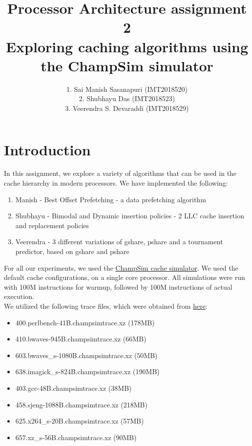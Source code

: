 \documentclass[a4paper]{article}
\title{Processor Architecture assignment 2\\\Large{Exploring caching algorithms using the ChampSim simulator}}
\author{1. Sai Manish Sasanapuri (IMT2018520)\\ 2. Shubhayu Das (IMT2018523)\\  3. Veerendra S. Devaraddi (IMT2018529)}
\begin{document}
\maketitle
\tableofcontents
\pagebreak

\section{Introduction}
    In this assignment, we explore a variety of algorithms that can be used in the cache hierarchy in modern processors. We have implemented the following:
    \begin{enumerate}
        \item Manish - Best Offset Prefetching - a data prefetching algorithm
        \item Shubhayu - Bimodal and Dynamic insertion policies - 2 LLC cache insertion and replacement policies
        \item Veerendra - 3 different variations of gshare, pshare and a tournament predictor, based on gshare and pshare
    \end{enumerate}
    
    For all our experiments, we used the \href{https://github.com/ChampSim/ChampSim}{ChampSim cache simulator}. We used the default cache configurations, on a single core processor. All simulations were run with 100M instructions for warmup, followed by 100M instructions of actual execution.\\
    
    We utilized the following trace files, which were obtained from \href{http://hpca23.cse.tamu.edu/champsim-traces/speccpu/}{here}:
    \begin{itemize}
        \item 400.perlbench-41B.champsimtrace.xz (178MB)
        \item 410.bwaves-945B.champsimtrace.xz (66MB)
        \item 603.bwaves\_s-1080B.champsimtrace.xz (50MB)
        \item 638.imagick\_s-824B.champsimtrace.xz (190MB)
        \item 403.gcc-48B.champsimtrace.xz (38MB)
        \item 458.sjeng-1088B.champsimtrace.xz (218MB)
        \item 625.x264\_s-20B.champsimtrace.xz (57MB)
        \item 657.xz\_s-56B.champsimtrace.xz (90MB)
    \end{itemize}
    
\end{document}
